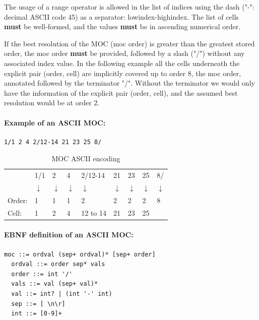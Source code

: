 \documentclass[11pt,a4paper]{ivoa}
\begin{document}
The usage of a range operator is allowed in the list of indices using the
dash ("-": decimal ASCII code 45) as a separator: lowindex-highindex.
The list of cells {\bf must} be well-formed, and the values {\bf must}
be in ascending numerical order.

If the best resolution of the MOC (moc order) is greater than the
greatest stored order, the moc order {\bf must} be provided, followed
by a slash ("/") without any associated index value.
In the following example all the
cells underneath the explicit pair (order, cell) are implicitly covered
up to order 8, the moc order, annotated followed by the terminator "/".
Without the terminator we would only have the information of the explicit
pair (order, cell), and the assumed best resolution would be at order 2.   


\paragraph{Example of an ASCII MOC:}
\begin{lstlisting}[]
    1/1 2 4 2/12-14 21 23 25 8/
\end{lstlisting}

\begin{table}[!htbp]
\begin{center}
   {\small
   \begin{tabular} { l l l l l l l l l }
   & 1/1   & 2  & 4  & 2/12-14 & 21 & 23 &  25 & 8/ \\
   & $\downarrow$ & $\downarrow$ & $\downarrow$ & $\downarrow$ & $\downarrow$ & $\downarrow$ & $\downarrow$ & $\downarrow$ \\
Order:     & 1    & 1 & 1 & 2        & 2  &  2 & 2  & 8 \\
Cell:      & 1    & 2 & 4 & 12 to 14 & 21 & 23 & 25 & \\
\end{tabular}
}
\end{center}
\caption*{MOC ASCII encoding}\label{table:moc-ascii-ex}
\end{table}


\paragraph{EBNF definition of an ASCII MOC:}
\begin{lstlisting}[]
  moc ::= ordval (sep+ ordval)* [sep+ order]
  ordval ::= order sep* vals
  order ::= int '/'
  vals ::= val (sep+ val)*
  val ::= int? | (int '-' int)
  sep ::= [ \n\r]
  int ::= [0-9]+
\end{lstlisting}
\end{document}
